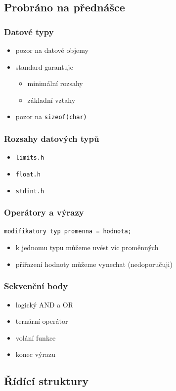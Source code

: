 \subsection{Probráno na přednášce}

\begin{frame}
	\frametitle{Datové typy}
	\begin{itemize}
		\item{pozor na datové objemy}
		\item{standard garantuje}
		\begin{itemize}
			\item{minimální rozsahy}
			\item{základní vztahy}
		\end{itemize}
		\item{pozor na \texttt{sizeof(char)}}
	\end{itemize}
\end{frame}

\begin{frame}
	\frametitle{Rozsahy datových typů}
	\begin{itemize}
		\item{\texttt{limits.h}}
		\item{\texttt{float.h}}
		\item{\texttt{stdint.h}}
	\end{itemize}
\end{frame}

\begin{frame}
	\frametitle{Operátory a výrazy}
	\texttt{modifikatory typ promenna = hodnota;}
	\begin{itemize}
		\item{k jednomu typu můžeme uvést víc proměnných}
		\item{přiřazení hodnoty můžeme vynechat (nedoporučuji)}
	\end{itemize}
\end{frame}

\begin{frame}
	\frametitle{Sekvenční body}
	\begin{itemize}
		\item{logický AND a OR}
		\item{ternární operátor}
		\item{volání funkce}
		\item{konec výrazu}
	\end{itemize}
\end{frame}

\subsection{Řídící struktury}


